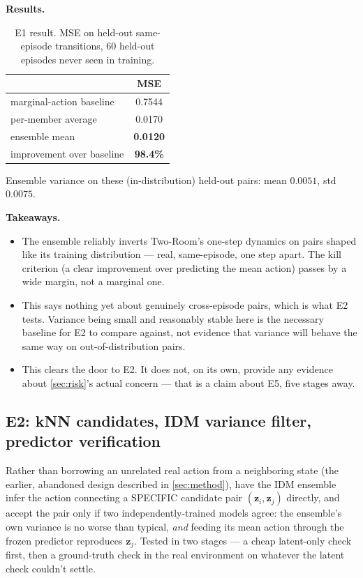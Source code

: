 \documentclass[11pt]{article}
\newcommand{\zv}{\mathbf{z}}
\begin{document}
\textbf{Results.}

\begin{table}[h]
\centering
\caption{E1 result. MSE on held-out same-episode transitions, 60 held-out episodes never seen
in training.}
\begin{tabular}{lc}
\toprule
& MSE \\
\midrule
marginal-action baseline & 0.7544 \\
per-member average & 0.0170 \\
ensemble mean & \textbf{0.0120} \\
\midrule
improvement over baseline & \textbf{98.4\%} \\
\bottomrule
\end{tabular}
\end{table}

Ensemble variance on these (in-distribution) held-out pairs: mean $0.0051$, std $0.0075$.

\textbf{Takeaways.}
\begin{itemize}[leftmargin=1.4em,itemsep=2pt]
\item The ensemble reliably inverts Two-Room's one-step dynamics on pairs shaped like its
training distribution --- real, same-episode, one step apart. The kill criterion (a clear
improvement over predicting the mean action) passes by a wide margin, not a marginal one.
\item This says nothing yet about genuinely cross-episode pairs, which is what E2 tests.
Variance being small and reasonably stable here is the necessary baseline for E2 to compare
against, not evidence that variance will behave the same way on out-of-distribution pairs.
\item This clears the door to E2. It does not, on its own, provide any evidence about
\cref{sec:risk}'s actual concern --- that is a claim about E5, five stages away.
\end{itemize}

\subsection{E2: kNN candidates, IDM variance filter, predictor verification}
\label{sec:e2-results}

Rather than borrowing an unrelated real action from a neighboring state (the earlier,
abandoned design described in \cref{sec:method}), have the IDM ensemble infer the action
connecting a SPECIFIC candidate pair $(\zv_i,\zv_j)$ directly, and accept the pair only if
two independently-trained models agree: the ensemble's own variance is no worse than
typical, \emph{and} feeding its mean action through the frozen predictor reproduces $\zv_j$.
Tested in two stages --- a cheap latent-only check first, then a ground-truth check in the
real environment on whatever the latent check couldn't settle.
\end{document}
